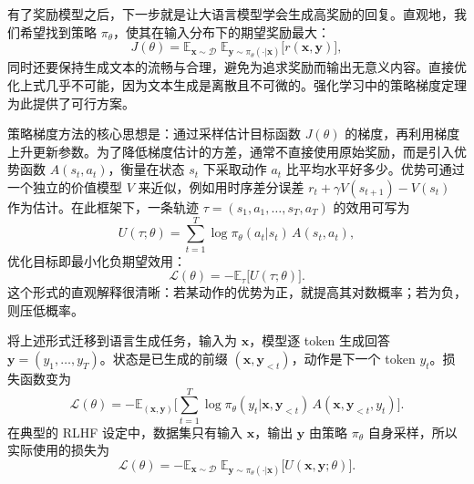

\label{sec:rlhf-training-llms}

有了奖励模型之后，下一步就是让大语言模型学会生成高奖励的回复。直观地，我们希望找到策略 $\pi_{\theta}$，使其在输入分布下的期望奖励最大：
\begin{equation}
J(\theta) = \mathbb{E}_{\mathbf{x}\sim\mathcal{D}}\;\mathbb{E}_{\mathbf{y}\sim\pi_{\theta}(\cdot|\mathbf{x})}\big[r(\mathbf{x},\mathbf{y})\big],
\end{equation}
同时还要保持生成文本的流畅与合理，避免为追求奖励而输出无意义内容。直接优化上式几乎不可能，因为文本生成是离散且不可微的。强化学习中的策略梯度定理为此提供了可行方案。

策略梯度方法的核心思想是：通过采样估计目标函数 $J(\theta)$ 的梯度，再利用梯度上升更新参数。为了降低梯度估计的方差，通常不直接使用原始奖励，而是引入优势函数 $A(s_t,a_t)$，衡量在状态 $s_t$ 下采取动作 $a_t$ 比平均水平好多少。优势可通过一个独立的价值模型 $V$ 来近似，例如用时序差分误差 $r_t + \gamma V(s_{t+1}) - V(s_t)$ 作为估计。在此框架下，一条轨迹 $\tau=(s_1,a_1,\dots,s_T,a_T)$ 的效用可写为
\begin{equation}
U(\tau;\theta) = \sum_{t=1}^{T} \log \pi_{\theta}(a_t|s_t)\,A(s_t,a_t),
\end{equation}
优化目标即最小化负期望效用：
\begin{equation}
\mathcal{L}(\theta) = -\mathbb{E}_{\tau}\big[U(\tau;\theta)\big].
\end{equation}
这个形式的直观解释很清晰：若某动作的优势为正，就提高其对数概率；若为负，则压低概率。

将上述形式迁移到语言生成任务，输入为 $\mathbf{x}$，模型逐 token 生成回答 $\mathbf{y}=(y_1,\dots,y_T)$。状态是已生成的前缀 $(\mathbf{x},\mathbf{y}_{<t})$，动作是下一个 token $y_t$。损失函数变为
\begin{equation}
\mathcal{L}(\theta) = -\mathbb{E}_{(\mathbf{x},\mathbf{y})}\Big[\sum_{t=1}^{T} \log \pi_{\theta}(y_t|\mathbf{x},\mathbf{y}_{<t})\,A(\mathbf{x},\mathbf{y}_{<t},y_t)\Big].
\end{equation}
在典型的 RLHF 设定中，数据集只有输入 $\mathbf{x}$，输出 $\mathbf{y}$ 由策略 $\pi_{\theta}$ 自身采样，所以实际使用的损失为
\begin{equation}
\mathcal{L}(\theta) = -\mathbb{E}_{\mathbf{x}\sim\mathcal{D}}\;\mathbb{E}_{\mathbf{y}\sim\pi_{\theta}(\cdot|\mathbf{x})}\Big[U(\mathbf{x},\mathbf{y};\theta)\Big].
\end{equation}

